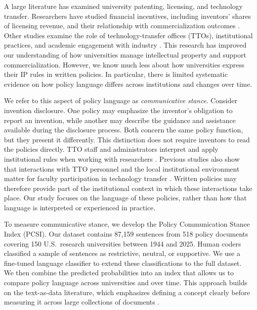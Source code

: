 \documentclass[11pt]{article}
\begin{document}
A large literature has examined university patenting, licensing, and technology transfer. Researchers have studied financial incentives, including inventors' shares of licensing revenue, and their relationship with commercialization outcomes \citep{lach2008incentives,ouellette2020patent}. Other studies examine the role of technology-transfer offices (TTOs), institutional practices, and academic engagement with industry \citep{jensen2003disclosure,siegel2003assessing,perkmann2021academic}. This research has improved our understanding of how universities manage intellectual property and support commercialization. However, we know much less about how universities express their IP rules in written policies. In particular, there is limited systematic evidence on how policy language differs across institutions and changes over time.

We refer to this aspect of policy language as \emph{communicative stance}. Consider invention disclosure. One policy may emphasize the inventor's obligation to report an invention, while another may describe the guidance and assistance available during the disclosure process. Both concern the same policy function, but they present it differently. This distinction does not require inventors to read the policies directly. TTO staff and administrators interpret and apply institutional rules when working with researchers \citep{jensen2003disclosure,siegel2003assessing}. Previous studies also show that interactions with TTO personnel and the local institutional environment matter for faculty participation in technology transfer \citep{owensmith2001patent,bercovitz2008academic}. Written policies may therefore provide part of the institutional context in which these interactions take place. Our study focuses on the language of these policies, rather than how that language is interpreted or experienced in practice.

To measure communicative stance, we develop the Policy Communication Stance Index (PCSI). Our dataset contains 87,159 sentences from 518 policy documents covering 150 U.S.\ research universities between 1944 and 2025. Human coders classified a sample of sentences as restrictive, neutral, or supportive. We use a fine-tuned language classifier to extend these classifications to the full dataset. We then combine the predicted probabilities into an index that allows us to compare policy language across universities and over time. This approach builds on the text-as-data literature, which emphasizes defining a concept clearly before measuring it across large collections of documents \citep{grimmer2013text,gentzkow2019text,adcock2001measurement}.
\end{document}
